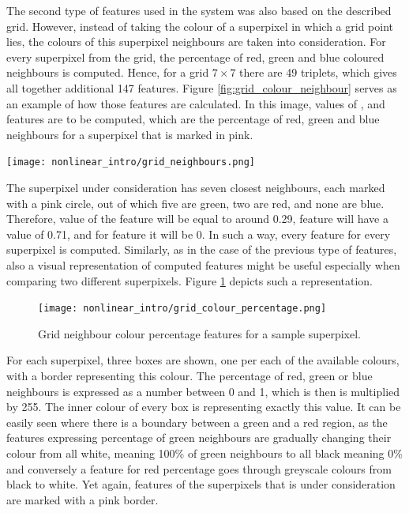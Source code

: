 The second type of features used in the system was also based on the described grid. However, instead of taking the colour of a superpixel in which a grid point lies, the colours of this superpixel neighbours are taken into consideration. For every superpixel from the grid, the percentage of red, green and blue coloured neighbours is computed. Hence, for a grid $7 \times 7$ there are 49 triplets, which gives all together additional 147 features. Figure \ref{fig:grid_colour_neighbour} serves as an example of how those features are calculated. In this image, values of ,  and  features are to be computed, which are the percentage of red, green and blue neighbours for a superpixel that is marked in pink. 
\begin{center}
    \centering
    \texttt{[image: nonlinear\_intro/grid\_neighbours.png]}
    \label{fig:grid_colour_neighbour}
\end{center}
The superpixel under consideration has seven closest neighbours, each marked with a pink circle, out of which five are green, two are red, and none are blue. Therefore, value of the  feature will be equal to around 0.29,  feature will have a value of 0.71, and for  feature it will be 0. In such a way, every feature for every superpixel is computed. Similarly, as in the case of the previous type of features, also a visual representation of computed features might be useful especially when comparing two different superpixels. Figure \ref{fig:grid_colour_neighbour_percentage} depicts such a representation. 
\begin{figure}[ht]
    \centering
    \texttt{[image: nonlinear\_intro/grid\_colour\_percentage.png]}
    \caption{Grid neighbour colour percentage features for a sample superpixel.}
    \label{fig:grid_colour_neighbour_percentage}
\end{figure}

For each superpixel, three boxes are shown, one per each of the available colours, with a border representing this colour. The percentage of red, green or blue neighbours is expressed as a number between 0 and 1, which is then is multiplied by 255. The inner colour of every box is representing exactly this value. It can be easily seen where there is a boundary between a green and a red region, as the features expressing percentage of green neighbours are gradually changing their colour from all white, meaning 100\% of green neighbours to all black meaning 0\% and conversely a feature for red percentage goes through greyscale colours from black to white. Yet again, features of the superpixels that is under consideration are marked with a pink border.

